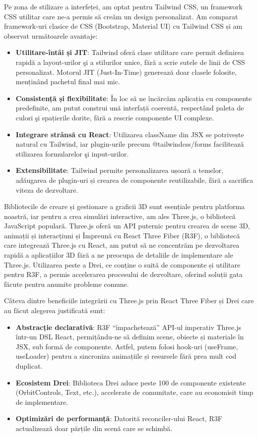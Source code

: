 Pe zona de stilizare a interfeței, am optat pentru Tailwind CSS, un framework CSS utilitar 
care ne-a permis să creăm un design personalizat. Am comparat framework-uri clasice de CSS
(Bootstrap, Material UI) cu Tailwind CSS și am observat următoarele avantaje:
\begin{itemize}
\item
  \textbf{Utilitare-întâi și JIT}:
    Tailwind oferă clase utilitare care permit definirea rapidă a
    layout-urilor şi a stilurilor unice, fără a scrie sutele de linii de CSS personalizat. Motorul
    JIT (Just-In-Time) generează doar clasele folosite, menținând pachetul final mai mic.
\item
  \textbf{Consistență și flexibilitate}:
    În loc să ne încărcăm aplicația cu componente predefinite,
    am putut construi ună interfață coerentă, respectând paleta de culori şi spațierile dorite,
    fără a rescrie componente UI complexe.
\item
  \textbf{Integrare strânsă cu React}:
    Utilizarea className din JSX se potrivește natural cu Tailwind,
    iar plugin-urile precum @tailwindcss/forms facilitează stilizarea
    formularelor şi input-urilor.
\item
  \textbf{Extensibilitate}:
    Tailwind permite personalizarea ușoară a temelor, adăugarea de plugin-uri și crearea de 
    componente reutilizabile, fără a sacrifica viteza de dezvoltare.
\end{itemize}

Bibliotecile de creare și gestionare a graficii 3D sunt esențiale pentru platforma noastră,
iar pentru a crea simulări interactive, am ales Three.js, o bibliotecă JavaScript populară.
Three.js oferă un API puternic pentru crearea de scene 3D, animații și interacțiuni și Împreună
cu React Three Fiber (R3F), o bibliotecă care integrează Three.js cu React, am putut să ne concentrăm
pe dezvoltarea rapidă a aplicațiilor 3D fără a ne preocupa de detaliile de implementare ale Three.js.
Utilizarea peste a Drei, ce conține o suită de componente și utilitare pentru R3F, a permis accelerarea
procesului de dezvoltare, oferind soluții gata făcute pentru anumite probleme comune.

Câteva dintre beneficiile integrării cu Three.js prin React Three Fiber și Drei care au făcut 
alegerea justificată sunt:

\begin{itemize}
\item
  \textbf{Abstracție declarativă}:
    R3F “împachetează” API-ul imperativ Three.js într-un DSL React, 
    permițându-ne să definim scene, obiecte și materiale în JSX, sub formă de componente. 
    Astfel, putem folosi hook-uri (useFrame, useLoader) pentru a sincroniza animațiile și 
    resursele fără prea mult cod duplicat.
\item
  \textbf{Ecosistem Drei}:
    Biblioteca Drei aduce peste 100 de componente existente (OrbitControls,
    Text, etc.), accelerate de comunitate, care au economisit timp de
    implementare.
\item
  \textbf{Optimizări de performanță}:
    Datorită reconciler-ului React, R3F actualizează doar părțile
    din scenă care se schimbă.
\end{itemize}

